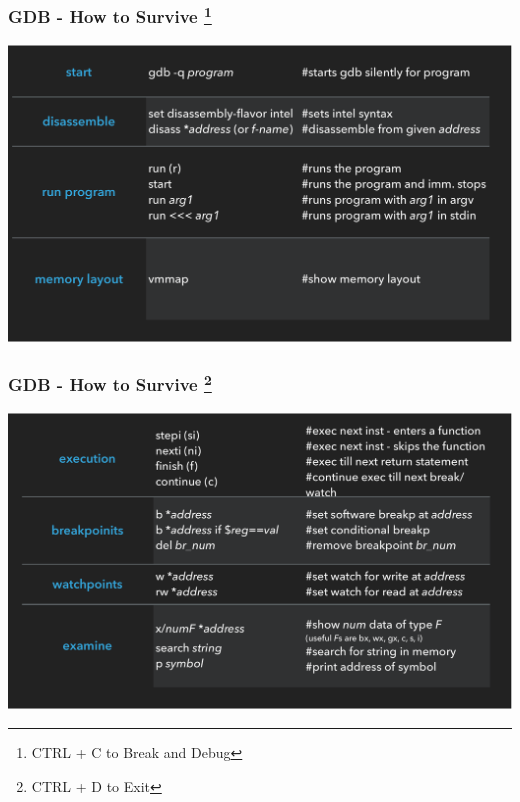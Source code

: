 \documentclass[]{beamer}
\begin{document}

\begin{frame}
  \frametitle{GDB - How to Survive \footnote{CTRL + C to Break and Debug} }
  \hspace*{-11mm}
  \includegraphics[width=\paperwidth]{./images/gdb_2.pdf}
\end{frame}

\begin{frame}
  \frametitle{GDB - How to Survive \footnote{CTRL + D to Exit}}
  \hspace*{-11mm}
  \includegraphics[width=\paperwidth]{./images/gdb_3.pdf}
\end{frame}
\end{document}
